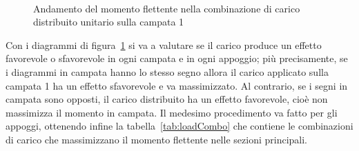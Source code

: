 \begin{figure}
	\centering
	\\
	\caption{Andamento del momento flettente nella combinazione di carico distribuito unitario sulla campata 1}
	\label{fig:bendingMoment_loadSpan_1}
\end{figure}

Con i diagrammi di figura~\ref{fig:bendingMoment_loadSpan_1} si va a valutare se il carico produce un effetto favorevole o sfavorevole in ogni campata e in ogni appoggio; più precisamente, se i diagrammi in campata hanno lo stesso segno allora il carico applicato sulla campata 1 ha un effetto sfavorevole e va massimizzato. Al contrario, se i segni in campata sono opposti, il carico distribuito ha un effetto favorevole, cioè non massimizza il momento in campata. Il medesimo procedimento va fatto per gli appoggi, ottenendo infine la tabella~\ref{tab:loadCombo} che contiene le combinazioni di carico che massimizzano il momento flettente nelle sezioni principali. 

